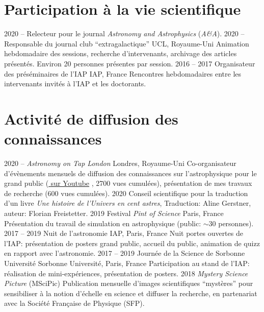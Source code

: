 \documentclass[french]{cv-style}
\newcommand{\myhref}[2]{\href{#1}{%
  \setul{1pt}{.4pt}%
  \setulcolor{red}%
  \ul{#2}}%
}
\begin{document}
%
%
%
\section{Participation à la vie scientifique}
\begin{entrylist}
%
\entryshortnohl
{2020 --}
{Relecteur pour le journal \emph{Astronomy and Astrophysics} (\emph{A\&A}).}
{}
%
\entrynohl
{2020 --}
{Responsable du journal club ``extragalactique''}
{UCL, Royaume-Uni}
{
  Animation hebdomadaire des sessions, recherche d'intervenants, archivage des articles présentés. Environ 20 personnes présentes par session.
}
%
\entrynohl
{2016 -- 2017}
{Organisateur des préséminaires de l'IAP}
{IAP, France}
{
  Rencontres hebdomadaires entre les intervenants invités à l'IAP et les doctorants.
}
\end{entrylist}

\section{Activité de diffusion des connaissances}
\begin{entrylist}
%
\entry
{2020 --}
{\emph{Astronomy on Tap London}}
{Londres, Royaume-Uni}
{
  {Co-organisateur} d'évènements mensuels de diffusion des connaissances sur l'astrophysique pour le grand public (\myhref{https://www.youtube.com/channel/UCAbbb3jRWXrv-5Wjhd_OFuA}{sur Youtube}, 2700 vues cumulées), présentation de mes travaux de recherche (600 vues cumulées).
}
%
\entry
{2020}
{Conseil scientifique pour la traduction d'un livre}
{}
{
  \emph{Une histoire de l'Univers en cent astres}, Traduction: Aline Gerstner, auteur: Florian Freistetter.
}
%
\entry
{2019}
{Festival \emph{Pint of Science}}
{Paris, France}
{
  {Présentation} du travail de simulation en astrophysique (public: $\sim 30$ personnes).
}
%
\entry
{2017 -- 2019}
{Nuit de l'astronomie}
{IAP, Paris, France}
{
  Nuit portes ouvertes de l'IAP: présentation de posters grand public, accueil du public, animation de quizz en rapport avec l'astronomie.
}
%
\entry
{2017 -- 2019}
{Journée de la Science de Sorbonne Université}
{Sorbonne Université, Paris, France}
{
  Participation au stand de l'IAP: réalisation de mini-expériences, présentation de posters.
}
%
\entry
{2018}
{\emph{Mystery Science Picture} (MSciPic)}
{}
{
  Publication mensuelle d'images scientifiques ``mystères'' pour sensibiliser à la notion d'échelle en science et diffuser la recherche, en partenariat avec la Société Française de Physique (SFP).
}
\end{entrylist}
\end{document}
